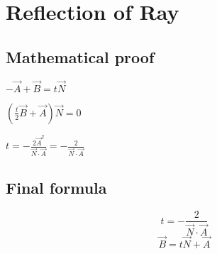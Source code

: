 \documentclass{article}
\begin{document}
\section{Reflection of Ray}
\subsection{Mathematical proof}
$-\vec{A} + \vec{B} = t\vec{N}$

$(\frac{t}{2}\vec{B} + \vec{A})\vec{N} = 0$

$t = -\frac{2\vec{A}^2}{\vec{N} \cdot \vec{A}} = -\frac{2}{\vec{N} \cdot \vec{A}}$

\subsection{Final formula}
\begin{equation}
t = -\frac{2}{\vec{N} \cdot \vec{A}}
\end{equation}
\begin{equation}
\vec{B} = t\vec{N} + \vec{A}
\end{equation}
\end{document}
